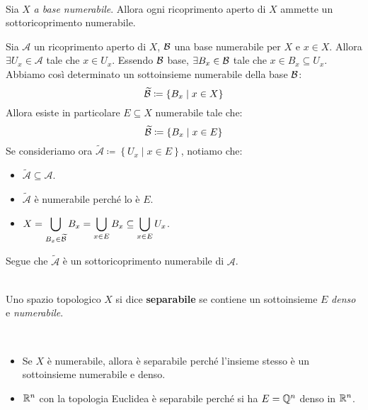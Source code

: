 \begin{proposition}~{}\\
Sia $X$ \textit{a base numerabile}. Allora ogni ricoprimento aperto di $X$ ammette un sottoricoprimento numerabile.
\end{proposition}
\begin{demonstration}
Sia $\mathcal{A}$ un ricoprimento aperto di $X$, $\mathcal{B}$ una base numerabile per $X$ e $x\in X$. Allora $\exists U_x\in\mathcal{A}$ tale che $x\in U_x$. Essendo $\mathcal{B}$ base, $\exists B_x\in\mathcal{B}$ tale che $x\in B_x\subseteq U_x$.\\
Abbiamo così determinato un sottoinsieme numerabile della base $\mathcal{B}$:
\begin{equation*}
\widetilde{\mathcal{B}}\coloneqq\left\{B_x\mid x\in X\right\}
\end{equation*}
Allora esiste in particolare $E\subseteq X$ numerabile tale che:
\begin{equation*}
\widetilde{\mathcal{B}}\coloneqq\left\{B_x\mid x\in E\right\}
\end{equation*}
Se consideriamo ora $\widetilde{\mathcal{A}}\coloneqq\left\{U_x\mid x\in E\right\}$, notiamo che:
\begin{itemize}
	\item $\widetilde{\mathcal{A}}\subseteq \mathcal{A}$.
	\item $\widetilde{\mathcal{A}}$ è numerabile perché lo è $E$.
	\item $\displaystyle X=\bigcup_{B_x\in\widetilde{\mathcal{B}}}B_x=\bigcup_{x\in E}B_x\subseteq \bigcup_{x\in E}U_x $.
\end{itemize}
Segue che $\widetilde{\mathcal{A}}$ è un sottoricoprimento numerabile di $\mathcal{A}$.
\end{demonstration}
\begin{define}~{}\\
Uno spazio topologico $X$ si dice \textbf{separabile} se contiene un sottoinsieme $E$ \textit{denso} e \textit{numerabile}.
\end{define}
\begin{examples}~{}
	\begin{itemize}
		\item Se $X$ è numerabile, allora è separabile perché l'insieme stesso è un sottoinsieme numerabile e denso.
		\item $\mathbb{R}^n$ con la topologia Euclidea è separabile perché si ha $E=\mathbb{Q}^n$ denso in $\mathbb{R}^n$.
	\end{itemize}
\vspace{-3mm}
\end{examples}
